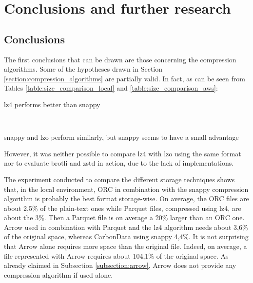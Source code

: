 \documentclass[10pt, a4paper]{report}
\begin{document}
\chapter{Conclusions and further research}

\section{Conclusions}

The first conclusions that can be drawn are those concerning the compression algorithms. Some of the hypotheses drawn in Section \ref{section:compression_algorithms} are partially valid. In fact, as can be seen from Tables \ref{table:size_comparison_local} and \ref{table:size_comparison_aws}: \\

\begin{itemize}
	\begin{minipage}{0.92\textwidth}
		\item lz4 performs better than snappy \\
	\end{minipage} \\
	\begin{minipage}{0.92\textwidth}
		\item snappy and lzo perform similarly, but snappy seems to have a small advantage \\
	\end{minipage}
\end{itemize}

However, it was neither possible to compare lz4 with lzo using the same format nor to evaluate brotli and zstd in action, due to the lack of implementations.

The experiment conducted to compare the different storage techniques shows that, in the local environment, ORC in combination with the snappy compression algorithm is probably the best format storage-wise. On average, the ORC files are about 2,5\% of the plain-text ones while Parquet files, compressed using lz4, are about the 3\%. Then a Parquet file is on average a 20\% larger than an ORC one. Arrow used in combination with Parquet and the lz4 algorithm needs about 3,6\% of the original space, whereas CarbonData using snappy 4,4\%. It is not surprising that Arrow alone requires more space than the original file. Indeed, on average, a file represented with Arrow requires about 104,1\% of the original space. As already claimed in Subsection \ref{subsection:arrow}, Arrow does not provide any compression algorithm if used alone.
\end{document}
